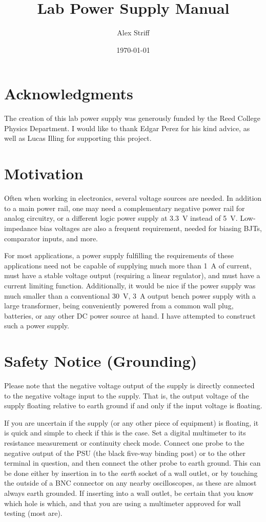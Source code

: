 \documentclass[letterpaper,twocolumn,11pt]{article}
\title{Lab Power Supply Manual}
\author{Alex Striff}
\date{\today}
\begin{document}
\maketitle
\tableofcontents
\thispagestyle{empty}

\section{Acknowledgments}

The creation of this lab power supply was generously funded by the Reed College
Physics Department. I would like to thank Edgar Perez for his kind advice, as
well as Lucas Illing for supporting this project.

\section{Motivation}

Often when working in electronics, several voltage sources are needed. In
addition to a main power rail, one may need a complementary negative power rail
for analog circuitry, or a different logic power supply at \SI{3.3}{\V} instead
of \SI{5}{\V}. Low-impedance bias voltages are also a frequent requirement,
needed for biasing BJTs, comparator inputs, and more.

For most applications, a power supply fulfilling the requirements of these
applications need not be capable of supplying much more than \SI{1}{\A} of
current, must have a stable voltage output (requiring a linear regulator), and
must have a current limiting function.  Additionally, it would be nice if the
power supply was much smaller than a conventional \SI{30}{\V}, \SI{3}{\A} output
bench power supply with a large transformer, being conveniently powered from a
common wall plug, batteries, or any other DC power source at hand. I have
attempted to construct such a power supply.

\section{Safety Notice (Grounding)}

Please note that the negative voltage output of the supply is directly connected
to the negative voltage input to the supply. That is, the output voltage of the
supply floating relative to earth ground if and only if the input voltage is
floating.

If you are uncertain if the supply (or any other piece of equipment) is
floating, it is quick and simple to check if this is the case. Set a digital
multimeter to its resistance measurement or continuity check mode. Connect one
probe to the negative output of the PSU (the black five-way binding post) or to
the other terminal in question, and then connect the other probe to earth
ground. This can be done either by insertion in to the \emph{earth} socket of a
wall outlet, or by touching the outside of a BNC connector on any nearby
oscilloscopes, as these are almost always earth grounded. If inserting into a
wall outlet, be certain that you know which hole is which, and that you are
using a multimeter approved for wall testing (most are).
\end{document}
